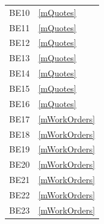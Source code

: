 \documentclass[12pt, titlepage]{article}
\begin{document}
\begin{longtable}{p{} p{}}
	BE10                  & \ref{mQuotes}                                                                                                          \\
	BE11                  & \ref{mQuotes}                                                                                                          \\
	BE12                  & \ref{mQuotes}                                                                                                          \\
	BE13                  & \ref{mQuotes}                                                                                                          \\
	BE14                  & \ref{mQuotes}                                                                                                          \\
	BE15                  & \ref{mQuotes}                                                                                                          \\
	BE16                  & \ref{mQuotes}                                                                                                          \\
	BE17                  & \ref{mWorkOrders}                                                                                                      \\
	BE18                  & \ref{mWorkOrders}                                                                                                      \\
	BE19                  & \ref{mWorkOrders}                                                                                                      \\
	BE20                  & \ref{mWorkOrders}                                                                                                      \\
	BE21                  & \ref{mWorkOrders}                                                                                                      \\
	BE22                  & \ref{mWorkOrders}                                                                                                      \\
	BE23                  & \ref{mWorkOrders}                                                                                                      \\

\end{longtable}
\end{document}

